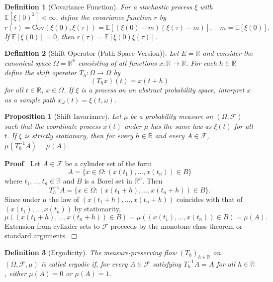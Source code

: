 \documentclass{article}
\newcommand{\tmem}[1]{{\em #1\/}}
\newenvironment{proof}{\noindent\textbf{Proof\ }}{\hspace*{\fill}$\Box$\medskip}
\newtheorem{definition}{Definition}
\newtheorem{proposition}{Proposition}
{\theorembodyfont{\rmfamily}\newtheorem{remark}{Remark}}
\begin{document}
\begin{definition}
  [Covariance Function] For a stochastic process $\xi$ with $\mathbb{E} [\xi
  (0)^2] < \infty$, define the {\tmem{covariance function}} $r$ by
  \[ r (\tau) = \text{Cov} (\xi (0), \xi (\tau)) =\mathbb{E} [(\xi (0) - m)
     (\xi (\tau) - m)], \quad m =\mathbb{E} [\xi (0)] . \]
  If $\mathbb{E} [\xi (0)] = 0$, then $r (\tau) =\mathbb{E} [\xi (0) \xi
  (\tau)]$.
\end{definition}

\begin{definition}
  [Shift Operator (Path Space Version)] Let $E =\mathbb{R}$ and consider the
  canonical space $\Omega =\mathbb{R}^{\mathbb{R}}$ consisting of all
  functions $x : \mathbb{R} \to \mathbb{R}$. For each $h \in \mathbb{R}$
  define the shift operator $T_h : \Omega \to \Omega$ by
  \[ (T_h x) (t) = x (t + h) \]
  for all $t \in \mathbb{R}$, $x \in \Omega$. If $\xi$ is a process on an
  abstract probability space, interpret $x$ as a sample path $x_{\omega} (t) =
  \xi (t, \omega)$.
\end{definition}

\begin{proposition}
  [Shift Invariance] Let $\mu$ be a probability measure on $(\Omega,
  \mathcal{F})$ such that the coordinate process $x (t)$ under $\mu$ has the
  same law as $\xi (t)$ for all $t$. If $\xi$ is strictly stationary, then for
  every $h \in \mathbb{R}$ and every $A \in \mathcal{F}$, $\mu (T_h^{- 1} A) =
  \mu (A)$.
\end{proposition}

\begin{proof}
  Let $A \in \mathcal{F}$ be a cylinder set of the form
  \[ A = \{ x \in \Omega : (x (t_1), \ldots, x (t_n)) \in B \} \]
  where $t_1, \ldots, t_n \in \mathbb{R}$ and $B$ is a Borel set in
  $\mathbb{R}^n$. Then
  \[ T_h^{- 1} A = \{ x \in \Omega : (x (t_1 + h), \ldots, x (t_n + h)) \in B
     \} . \]
  Since under $\mu$ the law of $(x (t_1 + h), \ldots, x (t_n + h))$ coincides
  with that of $(x (t_1), \ldots, x (t_n))$ by stationarity,
  \[ \mu ((x (t_1 + h), \ldots, x (t_n + h)) \in B) = \mu ((x (t_1), \ldots, x
     (t_n)) \in B) = \mu (A) . \]
  Extension from cylinder sets to $\mathcal{F}$ proceeds by the monotone class
  theorem or standard arguments.
\end{proof}

\begin{definition}
  [Ergodicity] The measure-preserving flow $(T_h)_{h \in \mathbb{R}}$ on
  $(\Omega, \mathcal{F}, \mu)$ is called {\tmem{ergodic}} if, for every $A \in
  \mathcal{F}$ satisfying $T_h^{- 1} A = A$ for all $h \in \mathbb{R}$, either
  $\mu (A) = 0$ or $\mu (A) = 1$.
\end{definition}
\end{document}
